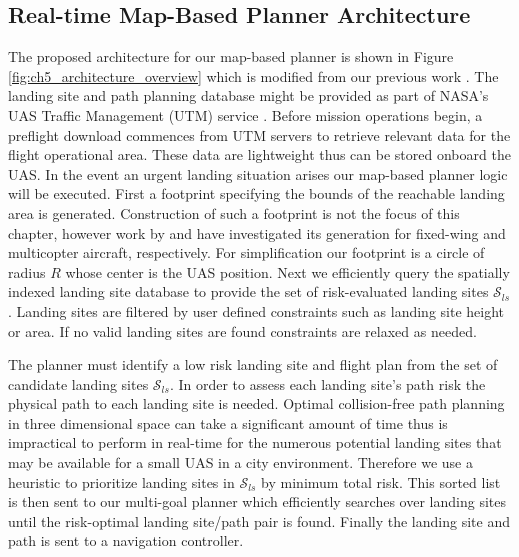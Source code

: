 \subsection{Real-time Map-Based Planner Architecture}\label{sec:ch5_architecture_planner}

The proposed architecture for our map-based planner is shown in Figure \ref{fig:ch5_architecture_overview} which is modified from our previous work \cite{atkins_emergency_2006, castagno_comprehensive_2018}. The landing site and path planning database might be provided as part of NASA's UAS Traffic Management (UTM) service \cite{prevot_uas_2016}. Before mission operations begin, a preflight download commences from UTM servers to retrieve relevant data for the flight operational area.  These data are lightweight thus can be stored onboard the UAS. 
In the event an urgent landing situation arises our map-based planner logic will be executed. First a footprint specifying the bounds of the reachable landing area is generated. Construction of such a footprint is not the focus of this chapter, however work by \cite{paul_flight_2017, atkins_emergency_2006} and \cite{ten_harmsel_emergency_2017} have investigated its generation for fixed-wing and multicopter aircraft, respectively. For simplification our footprint is a circle of radius $R$ whose center is the UAS position. Next we efficiently query the spatially indexed landing site database to provide the set of risk-evaluated landing sites $\mathcal{S}_{ls}$. Landing sites are filtered by user defined constraints such as landing site height or area. If no valid landing sites are found constraints are relaxed as needed.

The planner must identify a low risk landing site and flight plan  from the set of candidate landing sites $\mathcal{S}_{ls}$.  In order to assess each landing site's path risk the physical path to each landing site is needed. Optimal collision-free path planning in three dimensional space can take a significant amount of time thus is impractical to perform in real-time for the numerous potential landing sites that may be available for a small UAS in a city environment. Therefore we use a heuristic to prioritize landing sites in $\mathcal{S}_{ls}$ by minimum total risk. This sorted list is then sent to our multi-goal planner which efficiently searches over landing sites until the risk-optimal landing site/path pair is found. Finally the landing site and path is sent to a navigation controller. 

